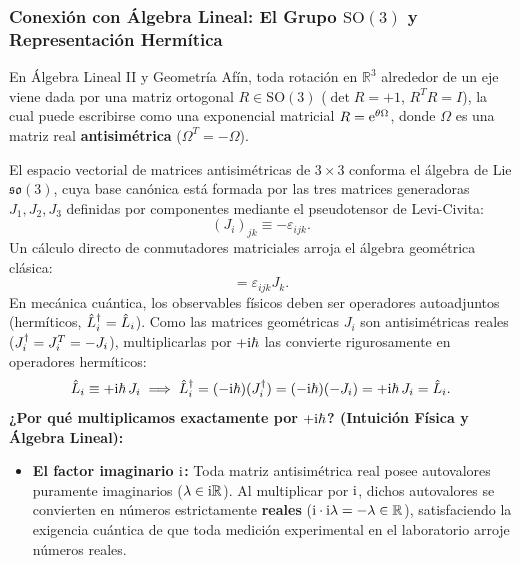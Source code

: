 \subsubsection{Conexión con Álgebra Lineal: El Grupo $\mathrm{SO}(3)$ y Representación Hermítica}

\begin{alertabox}
    En Álgebra Lineal II y Geometría Afín, toda rotación en $\mathbb{R}^3$ alrededor de un eje viene dada por una matriz ortogonal $R \in \mathrm{SO}(3)$ ($\det R = +1$, $R^T R = I$), la cual puede escribirse como una exponencial matricial $R = \mathrm{e}^{\theta \Omega}$, donde $\Omega$ es una matriz real \textbf{antisimétrica} ($\Omega^T = -\Omega$).
    
    El espacio vectorial de matrices antisimétricas de $3\times 3$ conforma el álgebra de Lie $\mathfrak{so}(3)$, cuya base canónica está formada por las tres matrices generadoras $J_1, J_2, J_3$ definidas por componentes mediante el pseudotensor de Levi-Civita:
    \begin{equation}
        (J_i)_{jk} \equiv -\varepsilon_{ijk}.
    \end{equation}
    Un cálculo directo de conmutadores matriciales arroja el álgebra geométrica clásica:
    \begin{equation}
        [J_i, J_j] = \varepsilon_{ijk} J_k.
    \end{equation}
    En mecánica cuántica, los observables físicos deben ser operadores autoadjuntos (hermíticos, $\hat{L}_i^\dagger = \hat{L}_i$). Como las matrices geométricas $J_i$ son antisimétricas reales ($J_i^\dagger = J_i^T = -J_i$), multiplicarlas por $+\mathrm{i}\hbar$ las convierte rigurosamente en operadores hermíticos:
    \begin{equation}
        \hat{L}_i \equiv +\mathrm{i}\hbar\,J_i \implies \hat{L}_i^\dagger = (-\mathrm{i}\hbar)(J_i^\dagger) = (-\mathrm{i}\hbar)(-J_i) = +\mathrm{i}\hbar\,J_i = \hat{L}_i.
    \end{equation}
    \textbf{¿Por qué multiplicamos exactamente por $+\mathrm{i}\hbar$? (Intuición Física y Álgebra Lineal):}
    \begin{itemize}
        \item \textbf{El factor imaginario $\mathrm{i}$:} Toda matriz antisimétrica real posee autovalores puramente imaginarios ($\lambda \in \mathrm{i}\mathbb{R}$). Al multiplicar por $\mathrm{i}$, dichos autovalores se convierten en números estrictamente \textbf{reales} ($\mathrm{i} \cdot \mathrm{i}\lambda = -\lambda \in \mathbb{R}$), satisfaciendo la exigencia cuántica de que toda medición experimental en el laboratorio arroje números reales.

\end{itemize}
\end{alertabox}
